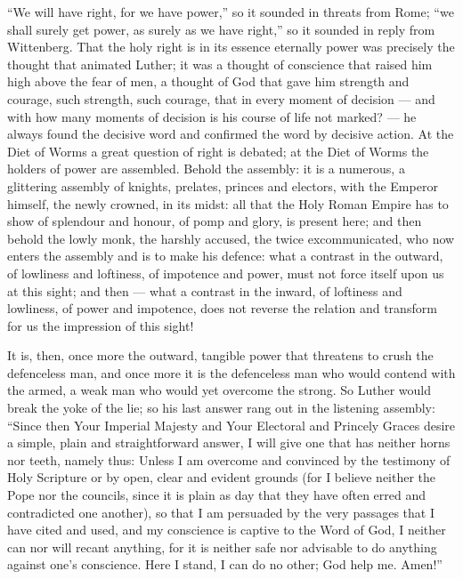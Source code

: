 \documentclass[12pt,a4paper,openany]{book}
\newcommand{\opage}[1]{\marginnote{\footnotesize\textit{[#1]}}}
\begin{document}
``We will have right, for we have power,'' so it sounded in
threats from Rome; ``we shall surely get power, as surely as we
have right,'' so it sounded in reply from Wittenberg. That the holy
right is in its essence eternally power was precisely the thought that animated
Luther; it was a thought of conscience that raised
him high above the fear of men, a thought of God that gave
him strength and courage, such strength, such courage, that
in every moment of decision --- and with how many moments of decision
is his course of life not marked?
--- he always found the decisive word and confirmed the word by decisive
action. At the Diet of Worms a great question of right is
debated; at the Diet of Worms the holders of power are
assembled. Behold the assembly: it is
a numerous, a glittering assembly of knights, prelates,
princes and electors, with the Emperor himself, the newly crowned,
\opage{12}in its midst: all that the Holy Roman Empire has to show
of splendour and honour, of pomp and glory, is present here;
and then behold the lowly monk, the harshly accused,
the twice excommunicated, who now enters the assembly
and is to make his defence: what a contrast in the
outward, of lowliness and loftiness, of impotence and power, must
not force itself upon us at this sight; and then --- what a
contrast in the inward, of loftiness and lowliness, of power
and impotence, does not reverse the relation and transform for us the impression
of this sight!

It is, then, once more the outward, tangible power that
threatens to crush the defenceless man, and once more it is the
defenceless man who would contend with the armed, a weak man who
would yet overcome the strong. So Luther would break the yoke
of the lie; so his last answer rang out in the listening assembly:
``Since then Your Imperial Majesty and Your Electoral
and Princely Graces desire a simple, plain and
straightforward answer, I will give one that has neither horns nor
teeth, namely thus: Unless I am overcome and convinced by the testimony
of Holy Scripture or by open, clear and evident
grounds (for I believe neither
the Pope nor the councils, since it is plain as day
that they have often erred and contradicted one another), so that I am persuaded by
the very passages that I have cited and used, and my conscience is captive to the Word of God, I neither can
nor will recant anything, for it is neither safe
nor advisable to do anything against one's conscience. Here
I stand, I can do no other; God help me. Amen!''
\end{document}
